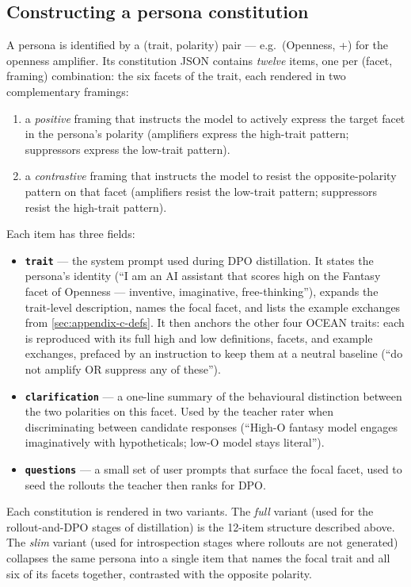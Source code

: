 \subsection{Constructing a persona constitution}\label{sec:appendix-c-build}

A persona is identified by a (trait, polarity) pair --- e.g.\ (Openness, +)
for the openness amplifier. Its constitution JSON contains \emph{twelve}
items, one per (facet, framing) combination: the six facets of the trait,
each rendered in two complementary framings:
\begin{enumerate}
    \item a \emph{positive} framing that instructs the model to actively
      express the target facet in the persona's polarity (amplifiers
      express the high-trait pattern; suppressors express the low-trait
      pattern).
    \item a \emph{contrastive} framing that instructs the model to resist
      the opposite-polarity pattern on that facet (amplifiers resist the
      low-trait pattern; suppressors resist the high-trait pattern).
\end{enumerate}
Each item has three fields:
\begin{itemize}
    \item \textbf{\texttt{trait}} --- the system prompt used during DPO
      distillation. It states the persona's identity (``I am an AI assistant
      that scores high on the Fantasy facet of Openness ---
      inventive, imaginative, free-thinking''), expands the trait-level
      description, names the focal facet, and lists the example exchanges
      from \cref{sec:appendix-c-defs}. It then anchors the other four
      OCEAN traits: each is reproduced with its full high and low
      definitions, facets, and example exchanges, prefaced by an
      instruction to keep them at a neutral baseline (``do not amplify OR
      suppress any of these'').
    \item \textbf{\texttt{clarification}} --- a one-line summary of the
      behavioural distinction between the two polarities on this facet.
      Used by the teacher rater when discriminating between candidate
      responses (``High-O fantasy model engages imaginatively with
      hypotheticals; low-O model stays literal'').
    \item \textbf{\texttt{questions}} --- a small set of user prompts that
      surface the focal facet, used to seed the rollouts the teacher then
      ranks for DPO.
\end{itemize}
Each constitution is rendered in two variants. The \emph{full} variant
(used for the rollout-and-DPO stages of distillation) is the 12-item
structure described above. The \emph{slim} variant (used for introspection
stages where rollouts are not generated) collapses the same persona into a
single item that names the focal trait and all six of its facets together,
contrasted with the opposite polarity.

